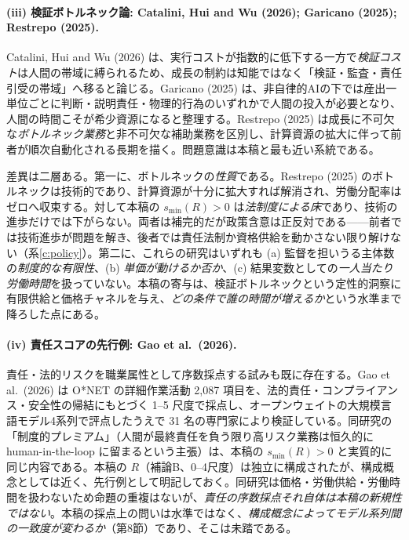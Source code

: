 \documentclass[11pt]{article}
\theoremstyle{plain}
\theoremstyle{definition}
\theoremstyle{remark}
\begin{document}
\paragraph{(iii) 検証ボトルネック論: Catalini, Hui and Wu (2026); Garicano (2025); Restrepo (2025).}
Catalini, Hui and Wu (2026) は、実行コストが指数的に低下する一方で\emph{検証コスト}は人間の帯域に縛られるため、成長の制約は知能ではなく「検証・監査・責任引受の帯域」へ移ると論じる。Garicano (2025) は、非自律的AIの下では産出一単位ごとに判断・説明責任・物理的行為のいずれかで人間の投入が必要となり、人間の時間こそが希少資源になると整理する。Restrepo (2025) は成長に不可欠な\emph{ボトルネック業務}と非不可欠な補助業務を区別し、計算資源の拡大に伴って前者が順次自動化される長期を描く。問題意識は本稿と最も近い系統である。

差異は二層ある。第一に、ボトルネックの\emph{性質}である。Restrepo (2025) のボトルネックは技術的であり、計算資源が十分に拡大すれば解消され、労働分配率はゼロへ収束する。対して本稿の $s_{\min}(R)>0$ は\emph{法制度による床}であり、技術の進歩だけでは下がらない。両者は補完的だが政策含意は正反対である——前者では技術進歩が問題を解き、後者では責任法制か資格供給を動かさない限り解けない（系\ref{c:policy}）。第二に、これらの研究はいずれも (a) 監督を担いうる主体数の\emph{制度的な有限性}、(b) \emph{単価が動けるか否か}、(c) 結果変数としての\emph{一人当たり労働時間}を扱っていない。本稿の寄与は、検証ボトルネックという定性的洞察に有限供給と価格チャネルを与え、\emph{どの条件で誰の時間が増えるか}という水準まで降ろした点にある。

\paragraph{(iv) 責任スコアの先行例: Gao et al.\ (2026).}
責任・法的リスクを職業属性として序数採点する試みも既に存在する。Gao et al.\ (2026) は O*NET の詳細作業活動 2{,}087 項目を、法的責任・コンプライアンス・安全性の帰結にもとづく 1--5 尺度で採点し、オープンウェイトの大規模言語モデル4系列で評点したうえで 31 名の専門家により検証している。同研究の「制度的プレミアム」（人間が最終責任を負う限り高リスク業務は恒久的に human-in-the-loop に留まるという主張）は、本稿の $s_{\min}(R)>0$ と実質的に同じ内容である。本稿の $R$（補論B、0--4尺度）は独立に構成されたが、構成概念としては近く、先行例として明記しておく。同研究は価格・労働供給・労働時間を扱わないため命題の重複はないが、\emph{責任の序数採点それ自体は本稿の新規性ではない}。本稿の採点上の問いは水準ではなく、\emph{構成概念によってモデル系列間の一致度が変わるか}（第8節）であり、そこは未踏である。
\end{document}
